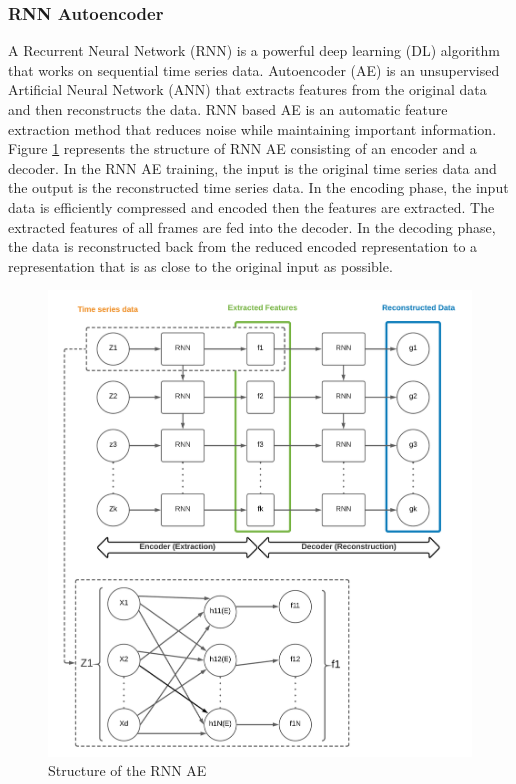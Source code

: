 \subsubsection*{RNN Autoencoder}

A Recurrent Neural Network (RNN) is a powerful deep learning (DL) algorithm that works on sequential time series data. Autoencoder (AE) is an unsupervised Artificial Neural Network (ANN) that extracts features from the original data and then reconstructs the data. RNN based AE is an automatic feature extraction method that reduces noise while maintaining important information. Figure \ref{fig:StructureRNNAE} represents the structure of RNN AE consisting of an encoder and a decoder. In the RNN AE training, the input is the original time series data and the output is the reconstructed time series data. In the encoding phase, the input data is efficiently compressed and encoded  then the features are extracted. The extracted features of all frames are fed into the decoder. In the decoding phase, the data is reconstructed back from the reduced encoded representation to a representation that is as close to the original input as possible.

\begin{figure}[ht]
	\centering
	\includegraphics[width=\textwidth]{gfx/Structure of RNN AE.PNG}
	\captionsetup{justification=centering}
	\caption{Structure of the RNN AE}
	\label{fig:StructureRNNAE}
\end{figure}

